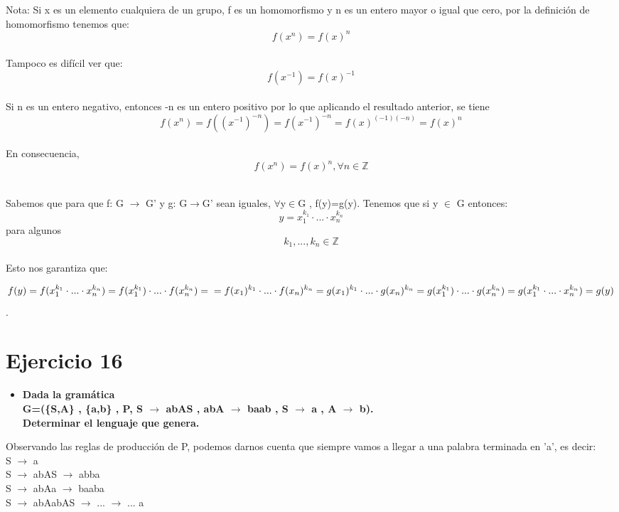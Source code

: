 Nota: 
Si x es un elemento cualquiera de un grupo, f es un homomorfismo y n es un entero mayor o igual que cero, por la definición de homomorfismo tenemos que: \[ f(x^n) = f(x)^n \] \\
Tampoco es difícil ver que: \[ f(x^{-1})=f(x)^{-1} \] \\
Si n es un entero negativo, entonces -n es un entero positivo por lo que aplicando el resultado anterior, se tiene \[ f(x^{n})=f((x^{-1})^{-n})=f(x^{-1})^{-n}=f(x)^{(-1)(-n)}=f(x)^n\] \\ 
En consecuencia, \[ f(x^{n})=f(x)^{n} , \forall n \in \mathbb{Z} \] \\


\horrule{0.5pt} 


Sabemos que para que  f: G $\rightarrow$ {G'} y  g: G$\rightarrow${G'} sean iguales, $\forall${y}$\in${G} ,  f(y)=g(y). 
Tenemos que si y $\in$ {G}  entonces:
\[y=x_1^{k_1}\cdot ... \cdot x_n^{k_n}\] para algunos \[k_1,...,k_n \in \mathbb{Z}\] \\
Esto nos garantiza que: 
\begin{center}
	\[f(y)=f(x_1^{k_1}\cdot ... \cdot x_n^{k_n})=f(x_1^{k_1})\cdot ...\cdot  f(x_n^{k_n})= \\ =f(x_1)^{k_1}\cdot ...\cdot f(x_n)^{k_n}= g(x_1)^{k_1}\cdot ...\cdot g(x_n)^{k_n} =  g(x_1^{k_1})\cdot ...\cdot g(x_n^{k_n}) = g(x_1^{k_1}\cdot ... \cdot x_n^{k_n}) = g(y)\].
	
\end{center}





\newpage
\section{Ejercicio 16}

\begin{itemize}
	\item \textbf{Dada la gramática \\
		G=(\{S,A\} , \{a,b\} , P, S $\rightarrow$ abAS , abA $\rightarrow$ baab , S $\rightarrow$ a , A $\rightarrow$ b).
		 \\ Determinar el lenguaje que genera.} 
\end{itemize}

Observando las reglas de producción de P, podemos darnos cuenta que siempre vamos a llegar a una palabra terminada en 'a', es decir: \\

S $\rightarrow$ a \\
S $\rightarrow$ abAS $\rightarrow$ abba \\
S $\rightarrow$ abAa $\rightarrow$ baaba \\
S $\rightarrow$ abAabAS $\rightarrow$ ... $\rightarrow$ ... a \\ \\

